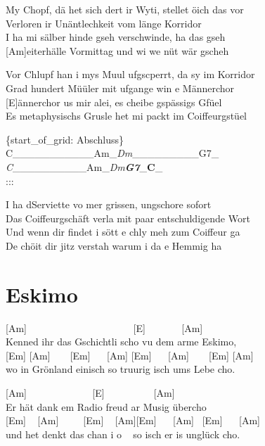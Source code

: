 \documentclass[
  letterpaper,
]{scrbook}
\begin{document}
My Chopf, dä het sich dert ir Wyti, stellet öich das vor\\
Verloren ir Unäntlechkeit vom länge Korridor\\
I ha mi sälber hinde gseh verschwinde, ha das gseh\\
{[}Am{]}eiterhälle Vormittag und wi we nüt wär gscheh

Vor Chlupf han i mys Muul ufgscperrt, da sy im Korridor\\
Grad hundert Müüler mit ufgange win e Männerchor\\
{[}E{]}ännerchor us mir alei, es cheibe gspässigs Gfüel\\
Es metaphysischs Grusle het mi packt im Coiffeurgstüel

\{start\_of\_grid: Abschluss\}\\
\textbar C\_\_\_\_\_\_\_\textbar\_\_\_\_Am\_\emph{\textbar Dm}\_\_\_\_\_\textbar\_\_\_\_G7\_\emph{\textbar{}\\
\textbar C}\_\_\_\_\_\_\textbar\_\_\_\_Am\_\emph{\textbar Dm\textbf{G7}\textbar{}}\_\textbf{C}\_\textbar{}\\
:::

I ha d\textquotesingle Serviette vo mer grissen, ungschore sofort\\
Das Coiffeurgschäft verla mit paar entschuldigende Wort\\
Und wenn dir findet i sött e chly meh zum Coiffeur ga\\
De chöit dir jitz verstah warum i da e Hemmig ha

\hypertarget{eskimo}{%
\chapter{Eskimo}\label{eskimo}}

{[}Am{]} ~ ~ ~ ~ ~ ~ ~ ~ ~ ~ ~ ~ ~{[}E{]} ~ ~ ~ ~ {[}Am{]}\\
Kenned ihr das Gschichtli scho vu dem arme Eskimo,\\
{[}Em{]} {[}Am{]} ~ ~ {[}Em{]} ~ ~{[}Am{]} {[}Em{]} ~ ~{[}Am{]} ~ ~
{[}Em{]} {[}Am{]}\\
wo in Grönland einisch so truurig isch ums Lebe cho.

{[}Am{]} ~ ~ ~ ~ ~ ~ ~ ~{[}E{]} ~ ~ ~ ~ ~ ~{[}Am{]}\\
Er hät dank em Radio freud ar Musig übercho\\
{[}Em{]} ~ {[}Am{]} ~ ~ ~{[}Em{]} ~ {[}Am{]}{[}Em{]} ~ ~{[}Am{]}
~{[}Em{]} ~ ~{[}Am{]}\\
und het denkt das chan i o ~ so isch er is unglück cho.
\end{document}
